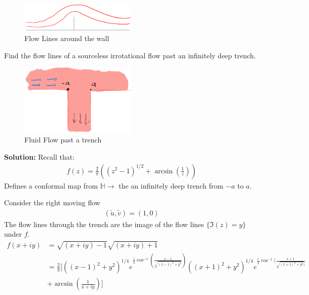 \begin{example}
    \begin{figure}[H]
        \centering
        \includegraphics[width=0.5\textwidth]{LECTURE_19/resultant-flow.png}
        \caption{Flow Lines around the wall}

    \end{figure}

\end{example}

\begin{example}
    Find the flow lines of a sourceless irrotational flow past an infinitely deep trench.
    \begin{figure}[H]
        \centering
        \includegraphics[width=0.5\textwidth]{LECTURE_19/trench.png}
        \caption{Fluid Flow past a trench}
    \end{figure}
    \textbf{Solution:}
    Recall that:
    \begin{align*}
        f(z) = \frac{2}\pi((z^2 -1)^{1/2} + \arcsin(\frac{1}z))
    \end{align*}
    Defines a conformal map from $\mathbb{H} \to$ the an infinitely deep trench from $-a$ to $a$.

    Consider the right moving flow
    \begin{align*}
        (\tilde{u}, \tilde{v}) = (1, 0)
    \end{align*}
    The flow lines through the trench are the image of the flow lines $\{\Im(z) = y\}$ under $f$.
    \begin{align*}
        f(x + iy) & = \sqrt{(x + iy) - 1}\sqrt{(x + iy) + 1}                                                                                                                                     \\
                  & = \frac{2}\pi[((x -1)^2 + y^2)^{1/4}e^{\frac{i}2\cos^{-1}(\frac{x -1}{\sqrt{(x-1)^2 + y^2}})}((x+1)^2 + y^2)^{1/4}e^{\frac{i}2\cos^{-1}(\frac{x + 1}{\sqrt{(x+1)^2 + y^2})}} \\
                  & + \arcsin(\frac{1}{x + iy})]
    \end{align*}


\end{example}
